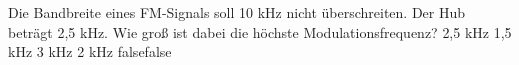     {Die Bandbreite eines FM-Signals soll 10 kHz nicht überschreiten. Der Hub beträgt 2,5 kHz. Wie groß ist dabei die höchste Modulationsfrequenz?}
    {2,5 kHz}
    {1,5 kHz}
    {3 kHz}
    {2 kHz}
    {false}{false}